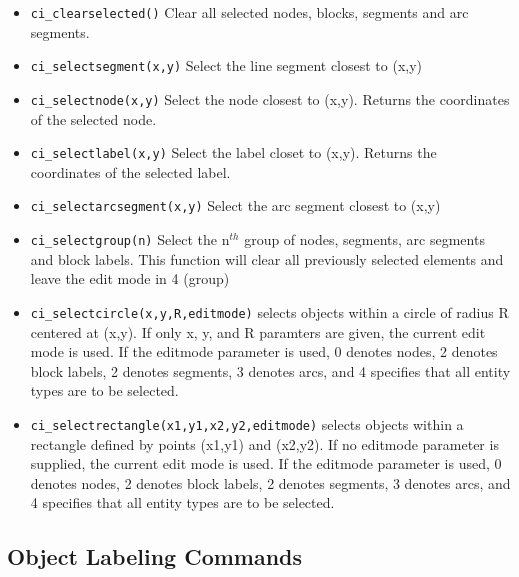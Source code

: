 \begin{itemize}
\item {\tt ci\_clearselected()} Clear all selected nodes, blocks, segments and arc
segments.

\item {\tt ci\_selectsegment(x,y)} Select the line segment closest to (x,y)

\item {\tt ci\_selectnode(x,y)} Select the node closest to (x,y).
Returns the coordinates of the selected node.

\item {\tt ci\_selectlabel(x,y)} Select the label closet to (x,y).
Returns the coordinates of the selected label.

\item {\tt ci\_selectarcsegment(x,y)} Select the arc segment closest to (x,y)

\item {\tt ci\_selectgroup(n)} Select the n$^{th}$ group of nodes, segments, arc
segments and block labels. This function will clear all previously selected
elements and leave the edit mode in 4 (group)

\item{\tt ci\_selectcircle(x,y,R,editmode)} selects objects within a circle of radius
R centered at (x,y).  If only x, y, and R paramters are given, the current
edit mode is used.  If the editmode parameter is used, 0 denotes nodes, 2
denotes block labels, 2 denotes segments, 3 denotes arcs, and 4 specifies
that all entity types are to be selected.

\item{\tt ci\_selectrectangle(x1,y1,x2,y2,editmode)} selects objects within a rectangle
defined by points (x1,y1) and (x2,y2). If no editmode parameter is supplied,
the current edit mode is used.  If the editmode parameter is used, 0 denotes
nodes, 2 denotes block labels, 2 denotes segments, 3 denotes arcs, and 4 
specifies that all entity types are to be selected.

\end{itemize}


\subsection{Object Labeling Commands}

